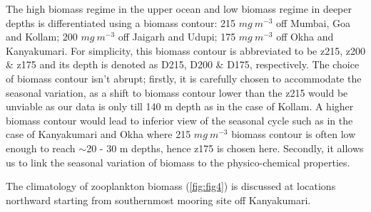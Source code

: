 \documentclass{article}
\begin{document}
	

	The high biomass regime in the upper ocean and low biomass regime in deeper depths is differentiated using a biomass contour: 215 $mg \ m^{-3}$ off Mumbai, Goa and Kollam; 200 $mg \ m^{-3}$ off Jaigarh and Udupi; 175 $mg \ m^{-3}$ off Okha and Kanyakumari. For simplicity, this biomass contour is abbreviated to be z215, z200 \& z175 and its depth is denoted as D215, D200 \& D175, respectively. The choice of biomass contour isn't abrupt; firstly, it is carefully chosen to accommodate the seasonal variation, as a shift to biomass contour lower than the z215 would be unviable as our data is only till 140 m depth as in the case of Kollam. A higher biomass contour would lead to inferior view of the seasonal cycle such as in the case of Kanyakumari and Okha where 215 $mg \ m^{-3}$ biomass contour is often low enough to reach $\sim$20 - 30 m depths, hence z175 is chosen here. Secondly, it allows us to link the seasonal variation of biomass to the physico-chemical properties.
	
	The climatology of zooplankton biomass (\cref{fig:fig4}) is discussed at locations northward starting from southernmost mooring site off Kanyakumari. 
	
\end{document}
